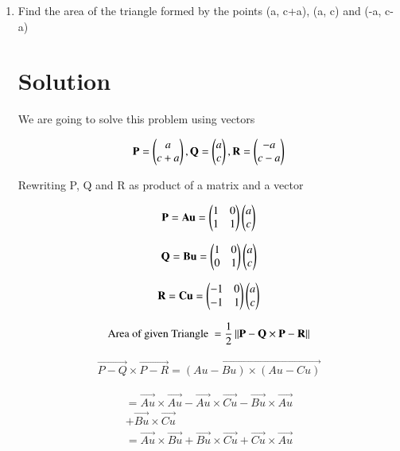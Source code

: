 \documentclass[journal,12pt,twocolumn]{IEEEtran}
\renewcommand\thesection{\arabic{section}}
\begin{document}
\begin{enumerate}[label=\thesection.\arabic*.,ref=\thesection.\theenumi]

\item Find the area of the triangle formed by the points (a, c+a), (a, c) and (-a, c-a)

\section{Solution}
We are going to solve this problem using vectors

\begin{align}
\mathbf{P} = \begin{pmatrix}a\\c+a\end{pmatrix}, \mathbf{Q} =\begin{pmatrix}a\\c\end{pmatrix},
\mathbf{R} =\begin{pmatrix}-a\\c-a\end{pmatrix}
\label{3}
\end{align}

Rewriting P, Q and R as product of a matrix and a vector

\begin{align}
\mathbf{P}=\mathbf{Au}=\begin{pmatrix}1&0\\1&1\end{pmatrix}\begin{pmatrix}a\\c\end{pmatrix}
\end{align}

\begin{align}
\mathbf{Q}=\mathbf{Bu}=\begin{pmatrix}1&0\\0&1\end{pmatrix}\begin{pmatrix}a\\c\end{pmatrix}
\end{align}

\begin{align}
\mathbf{R}=\mathbf{Cu}=\begin{pmatrix}-1&0\\-1&1\end{pmatrix}\begin{pmatrix}a\\c\end{pmatrix}
\end{align}

\begin{align}
\text{Area of given Triangle }=\frac{1}{2}\norm{\Vec{P-Q}\times  \Vec{P-R}}
\label{1}
\end{align}

\begin{align}
\Vec{P-Q}\times  \Vec{P-R} = \vec{(Au-Bu)\times(Au-Cu)}
\end{align}

\begin{align}
=\vec{Au}\times\vec{Au}-\vec{Au}\times\vec{Cu}-\vec{Bu}\times\vec{Au}\\+\vec{Bu}\times\vec{Cu}
\end{align}
\begin{align}
=\vec{Au}\times\vec{Bu}+\vec{Bu}\times\vec{Cu}+\vec{Cu}\times\vec{Au}
\end{align}


\end{enumerate}
\end{document}
